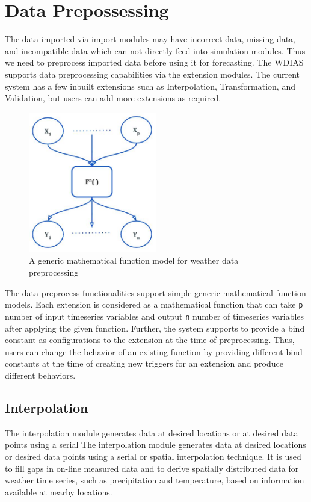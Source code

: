 \section{Data Prepossessing}
\label{se:data_preprocess}

The data imported via import modules may have incorrect data, missing data, and incompatible data which can not directly feed into simulation modules.
Thus we need to preprocess imported data before using it for forecasting. The WDIAS supports data preprocessing capabilities via the extension modules. The current system has a few inbuilt extensions such as Interpolation, Transformation, and Validation, but users can add more extensions as required.

\begin{figure}[htp]
    \centering
    \includegraphics[width=0.5\textwidth]{method/data_preprocess/weather_data_preprocessing.jpg}
    \caption{A generic mathematical function model for weather data preprocessing}
    \label{fi:weather_data_preprocessing}
\end{figure}

The data preprocess functionalities support simple generic mathematical function models. Each extension is considered as a mathematical function that can take \texttt{p} number of input timeseries variables and output \texttt{n} number of timeseries variables after applying the given function. Further, the system supports to provide a bind constant as configurations to the extension at the time of preprocessing. Thus, users can change the behavior of an existing function by providing different bind constants at the time of creating new triggers for an extension and produce different behaviors.

\subsection{Interpolation}
The interpolation module generates data at desired locations or at desired data points using a serial The interpolation module generates data at desired locations or desired data points using a serial or spatial interpolation technique. It is used to fill gaps in on-line measured data and to derive spatially distributed data for weather time series, such as precipitation and temperature, based on information available at nearby locations.

